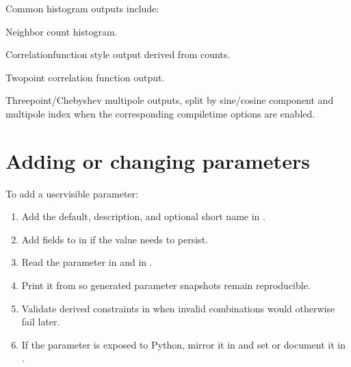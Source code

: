 \documentclass[letterpaper,10pt,english]{sphinxmanual}
\begin{document}
\sphinxAtStartPar
Common histogram outputs include:
\begin{description}
\sphinxAtStartPar
Neighbor count histogram.

\sphinxAtStartPar
Correlation\sphinxhyphen{}function style output derived from counts.

\sphinxAtStartPar
Two\sphinxhyphen{}point correlation function output.

\sphinxAtStartPar
Three\sphinxhyphen{}point/Chebyshev multipole outputs, split by sine/cosine component and
multipole index when the corresponding compile\sphinxhyphen{}time options are enabled.

\end{description}


\section{Adding or changing parameters}
\label{\detokenize{code_structure:adding-or-changing-parameters}}
\sphinxAtStartPar
To add a user\sphinxhyphen{}visible parameter:
\begin{enumerate}
%
\item {} 
\sphinxAtStartPar
Add the default, description, and optional short name in
.

\item {} 
\sphinxAtStartPar
Add fields to  in  if the
value needs to persist.

\item {} 
\sphinxAtStartPar
Read the parameter in  and  in
.

\item {} 
\sphinxAtStartPar
Print it from  so generated parameter snapshots remain
reproducible.

\item {} 
\sphinxAtStartPar
Validate derived constraints in  when invalid
combinations would otherwise fail later.

\item {} 
\sphinxAtStartPar
If the parameter is exposed to Python, mirror it in 
and set or document it in .

\end{enumerate}
\end{document}
